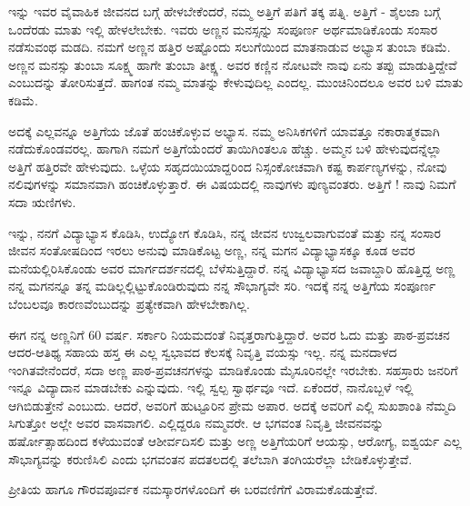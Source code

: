ಇನ್ನು ಇವರ ವೈವಾಹಿಕ ಜೀವನದ ಬಗ್ಗೆ ಹೇಳಬೇಕೆಂದರೆ, ನಮ್ಮ ಅತ್ತಿಗೆ ಪತಿಗೆ ತಕ್ಕ ಪತ್ನಿ. ಅತ್ತಿಗೆ - ಶೈಲಜಾ ಬಗ್ಗೆ ಒಂದೆರಡು ಮಾತು ಇಲ್ಲಿ ಹೇಳಲೇಬೇಕು. ಇವರು ಅಣ್ಣನ ಮನಸ್ಸನ್ನು ಸಂಪೂರ್ಣ ಅರ್ಥಮಾಡಿಕೊಂಡು ಸಂಸಾರ ನಡೆಸುವಂಥ ಮಡದಿ.  ನಮಗೆ ಅಣ್ಣನ ಹತ್ತಿರ ಅಷ್ಟೊಂದು ಸಲುಗೆಯಿಂದ ಮಾತನಾಡುವ ಅಭ್ಯಾಸ ತುಂಬಾ ಕಡಿಮೆ. ಅಣ್ಣನ ಮನಸ್ಸು ತುಂಬಾ ಸೂಕ್ಷ್ಮ ಹಾಗೇ ತುಂಬಾ ತೀಕ್ಷ್ಣ. ಅವರ ಕಣ್ಣಿನ ನೋಟವೇ ನಾವು ಏನು ತಪ್ಪು ಮಾಡುತ್ತಿದ್ದೇವೆ ಎಂಬುದನ್ನು ತೋರಿಸುತ್ತದೆ. ಹಾಗಂತ ನಮ್ಮ ಮಾತನ್ನು ಕೇಳುವುದಿಲ್ಲ ಎಂದಲ್ಲ. ಮುಂಚಿನಿಂದಲೂ ಅವರ ಬಳಿ ಮಾತು ಕಡಿಮೆ.

ಅದಕ್ಕೆ ಎಲ್ಲವನ್ನೂ ಅತ್ತಿಗೆಯ ಜೊತೆ ಹಂಚಿಕೊಳ್ಳುವ ಅಭ್ಯಾಸ. ನಮ್ಮ ಅನಿಸಿಕಗಳಿಗೆ ಯಾವತ್ತೂ ನಕಾರಾತ್ಮಕವಾಗಿ ನಡೆದುಕೊಂಡವರಲ್ಲ.  ಹಾಗಾಗಿ ನಮಗೆ ಅತ್ತಿಗೆಯೆಂದರೆ ತಾಯಿಗಿಂತಲೂ ಹೆಚ್ಚು.  ಅಮ್ಮನ ಬಳಿ ಹೇಳುವುದನ್ನೆಲ್ಲಾ ಅತ್ತಿಗೆ ಹತ್ತಿರವೇ ಹೇಳುವುದು. ಒಳ್ಳೆಯ ಸಹೃದಯಿಯಾದ್ದರಿಂದ ನಿಸ್ಸಂಕೋಚವಾಗಿ ಕಷ್ಟ ಕಾರ್ಪಣ್ಯಗಳನ್ನು, ನೋವು ನಲಿವುಗಳನ್ನು ಸಮಾನವಾಗಿ ಹಂಚಿಕೊಳ್ಳುತ್ತಾರೆ. ಈ ವಿಷಯದಲ್ಲಿ ನಾವುಗಳು ಪುಣ್ಯವಂತರು. ಅತ್ತಿಗೆ ! ನಾವು ನಿಮಗೆ ಸದಾ ಋಣಿಗಳು.

ಇನ್ನು, ನನಗೆ ವಿದ್ಯಾಭ್ಯಾಸ ಕೊಡಿಸಿ, ಉದ್ಯೋಗ ಕೊಡಿಸಿ, ನನ್ನ ಜೀವನ ಉಜ್ವಲವಾಗುವಂತೆ ಮತ್ತು ನನ್ನ ಸಂಸಾರ ಜೀವನ ಸಂತೋಷದಿಂದ ಇರಲು ಅನುವು ಮಾಡಿಕೊಟ್ಟ ಅಣ್ಣ, ನನ್ನ ಮಗನ ವಿದ್ಯಾಭ್ಯಾಸಕ್ಕೂ ಕೂಡ ಅವರ ಮನೆಯಲ್ಲಿರಿಸಿಕೊಂಡು ಅವರ ಮಾರ್ಗದರ್ಶನದಲ್ಲಿ ಬೆಳೆಸುತ್ತಿದ್ದಾರೆ.  ನನ್ನ ವಿದ್ಯಾಭ್ಯಾಸದ ಜವಾಬ್ದಾರಿ ಹೊತ್ತಿದ್ದ ಅಣ್ಣ  ನನ್ನ ಮಗನನ್ನೂ ತನ್ನ ಮಡಿಲ್ಲಲ್ಲಿಟ್ಟುಕೊಂಡಿರುವುದು ನನ್ನ ಸೌಭಾಗ್ಯವೇ ಸರಿ. ಇದಕ್ಕೆ ನನ್ನ ಅತ್ತಿಗೆಯ ಸಂಪೂರ್ಣ ಬೆಂಬಲವೂ ಕಾರಣವೆಂಬುದನ್ನು ಪ್ರತ್ಯೇಕವಾಗಿ ಹೇಳಬೇಕಾಗಿಲ್ಲ. 

ಈಗ ನನ್ನ ಅಣ್ಣನಿಗೆ 60 ವರ್ಷ. ಸರ್ಕಾರಿ ನಿಯಮದಂತೆ ನಿವೃತ್ತರಾಗುತ್ತಿದ್ದಾರೆ. ಅವರ ಓದು ಮತ್ತು ಪಾಠ-ಪ್ರವಚನ ಆದರ-ಆತಿಥ್ಯ ಸಹಾಯ ಹಸ್ತ ಈ ಎಲ್ಲ ಸ್ವಭಾವದ ಕೆಲಸಕ್ಕೆ ನಿವೃತ್ತಿ ವಯಸ್ಸು ಇಲ್ಲ.  ನನ್ನ ಮನದಾಳದ ಇಂಗಿತವೇನೆಂದರೆ, ಸದಾ ಅಣ್ಣ ಪಾಠ-ಪ್ರವಚನಗಳನ್ನು ಮಾಡಿಕೊಂಡು ಮೈಸೂರಿನಲ್ಲೇ ಇರಬೇಕು.  ಸಹಸ್ರಾರು ಜನರಿಗೆ ಇನ್ನೂ ವಿದ್ಯಾದಾನ ಮಾಡಬೇಕು ಎನ್ನುವುದು.  ಇಲ್ಲಿ ಸ್ವಲ್ಪ ಸ್ವಾರ್ಥವೂ ಇದೆ. ಏಕೆಂದರೆ, ನಾನೊಬ್ಬಳೆ ಇಲ್ಲಿ ಆಗಿಬಿಡುತ್ತೇನೆ ಎಂಬುದು.  ಆದರೆ, ಅವರಿಗೆ ಹುಟ್ಟೂರಿನ ಪ್ರೇಮ ಅಪಾರ.  ಅದಕ್ಕೆ ಅವರಿಗೆ ಎಲ್ಲಿ ಸುಖಶಾಂತಿ ನೆಮ್ಮದಿ ಸಿಗುತ್ತೋ ಅಲ್ಲೇ ಅವರ ವಾಸವಾಗಲಿ. ಎಲ್ಲಿದ್ದರೂ ನಮ್ಮವರೇ.  ಆ ಭಗವಂತ  ನಿವೃತ್ತಿ ಜೀವನವನ್ನು ಹರ್ಷೋತ್ಸಾಹದಿಂದ ಕಳೆಯುವಂತೆ ಆಶೀರ್ವದಿಸಲಿ ಮತ್ತು ಅಣ್ಣ ಅತ್ತಿಗೆಯರಿಗೆ ಆಯಸ್ಸು, ಆರೋಗ್ಯ, ಐಶ್ವರ್ಯ ಎಲ್ಲ ಸೌಭಾಗ್ಯವನ್ನು  ಕರುಣಿಸಿಲಿ ಎಂದು ಭಗವಂತನ ಪದತಲದಲ್ಲಿ ತಲೆಬಾಗಿ ತಂಗಿಯರೆಲ್ಲಾ ಬೇಡಿಕೊಳ್ಳುತ್ತೇವೆ.

ಪ್ರೀತಿಯ ಹಾಗೂ ಗೌರವಪೂರ್ವಕ ನಮಸ್ಕಾರಗಳೊಂದಿಗೆ ಈ ಬರವಣಿಗೆಗೆ ವಿರಾಮಕೊಡುತ್ತೇವೆ.
